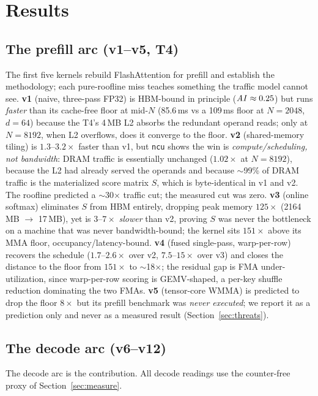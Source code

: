 \section{Results}
\label{sec:results}

\subsection{The prefill arc (v1--v5, T4)}
\label{sec:results-prefill}
The first five kernels rebuild FlashAttention for prefill and establish the
methodology; each pure-roofline miss teaches something the traffic model cannot
see. \textbf{v1} (naive, three-pass FP32) is HBM-bound in principle
($\mathit{AI} \approx 0.25$) but runs \emph{faster} than its cache-free floor at mid-$N$
(85.6\,ms vs a 109\,ms floor at $N{=}2048$, $d{=}64$) because the T4's 4\,MB L2
absorbs the redundant operand reads; only at $N{=}8192$, when L2 overflows, does
it converge to the floor. \textbf{v2} (shared-memory tiling) is
$1.3$--$3.2\times$ faster than v1, but \texttt{ncu} shows the win is
\emph{compute/scheduling, not bandwidth}: DRAM traffic is essentially unchanged
($1.02\times$ at $N{=}8192$), because the L2 had already served the operands and
because $\sim$99\% of DRAM traffic is the materialized score matrix $S$, which is
byte-identical in v1 and v2. The roofline predicted a $\sim$30$\times$ traffic
cut; the measured cut was zero. \textbf{v3} (online softmax) eliminates $S$ from
HBM entirely, dropping peak memory $125\times$ (2164\,MB $\to$ 17\,MB), yet is
$3$--$7\times$ \emph{slower} than v2, proving $S$ was never the bottleneck on a
machine that was never bandwidth-bound; the kernel sits $151\times$ above its MMA
floor, occupancy/latency-bound. \textbf{v4} (fused single-pass, warp-per-row)
recovers the schedule ($1.7$--$2.6\times$ over v2, $7.5$--$15\times$ over v3) and
closes the distance to the floor from $151\times$ to $\sim$18$\times$; the
residual gap is FMA under-utilization, since warp-per-row scoring is GEMV-shaped,
a per-key shuffle reduction dominating the two FMAs. \textbf{v5} (tensor-core WMMA)
is predicted to drop the floor $8\times$ but its prefill benchmark was
\emph{never executed}; we report it as a prediction only and never as a measured
result (Section~\ref{sec:threats}).

\subsection{The decode arc (v6--v12)}
\label{sec:results-decode}
The decode arc is the contribution. All decode readings use the counter-free
proxy of Section~\ref{sec:measure}.


